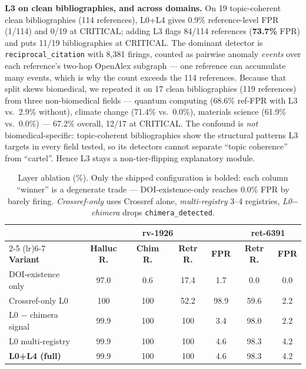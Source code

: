 \documentclass[runningheads]{llncs}
\begin{document}
\noindent\textbf{L3 on clean bibliographies, and across domains.} On 19 topic-coherent clean bibliographies (114 references), L0+L4 gives 0.9\% reference-level FPR (1/114) and 0/19 at CRITICAL; adding L3 flags 84/114 references (\textbf{73.7\%} FPR) and puts 11/19 bibliographies at CRITICAL. The dominant detector is \texttt{reciprocal\_citation} with 8{,}381 firings, counted as pairwise anomaly \emph{events} over each reference's two-hop OpenAlex subgraph --- one reference can accumulate many events, which is why the count exceeds the 114 references. Because that split skews biomedical, we repeated it on 17 clean bibliographies (119 references) from three non-biomedical fields --- quantum computing (68.6\% ref-FPR with L3 vs.\ 2.9\% without), climate change (71.4\% vs.\ 0.0\%), materials science (61.9\% vs.\ 0.0\%) --- 67.2\% overall, 12/17 at CRITICAL. The confound is \emph{not} biomedical-specific: topic-coherent bibliographies show the structural patterns L3 targets in every field tested, so its detectors cannot separate ``topic coherence'' from ``cartel''. Hence L3 stays a non-tier-flipping explanatory module.

\begin{table}[!tb]
\centering
\small
\setlength{\tabcolsep}{4pt}
\begin{tabular}{@{}lcccccc@{}}
\toprule
& \multicolumn{4}{c}{\textbf{rv-1926}} & \multicolumn{2}{c}{\textbf{ret-6391}} \\
\cmidrule(lr){2-5} \cmidrule(lr){6-7}
\textbf{Variant} & \textbf{Halluc R.} & \textbf{Chim R.} & \textbf{Retr R.} & \textbf{FPR}
                 & \textbf{Retr R.} & \textbf{FPR} \\
\midrule
DOI-existence only           & 97.0 & 0.6 & 17.4 & 1.7  & 0.0  & 0.0 \\
Crossref-only L0             & 100  & 100 & 52.2 & 98.9 & 59.6 & 2.2 \\
L0 $-$ chimera signal        & 99.9 & 100 & 100  & 3.4  & 98.0 & 2.2 \\
L0 multi-registry            & 99.9 & 100 & 100  & 4.6  & 98.3 & 4.2 \\
\textbf{L0+L4 (full)}        & 99.9 & 100 & 100  & 4.6  & 98.3 & 4.2 \\
\bottomrule
\end{tabular}
\caption{Layer ablation (\%). Only the shipped configuration is bolded: each column ``winner'' is a degenerate trade --- DOI-existence-only reaches 0.0\% FPR by barely firing. \emph{Crossref-only} uses Crossref alone, \emph{multi-registry} 3--4 registries, \emph{L0$-$chimera} drops \texttt{chimera\_detected}.}
\label{tab:ablation}
\end{table}
\end{document}

